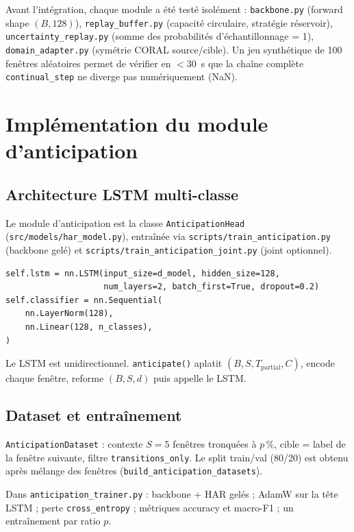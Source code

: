 \documentclass[a4paper,12pt]{report}
\begin{document}
Avant l'intégration, chaque module a été testé isolément : \texttt{backbone.py}
(forward shape $(B,128)$), \texttt{replay\_buffer.py} (capacité circulaire,
stratégie réservoir), \texttt{uncertainty\_replay.py} (somme des probabilités
d'échantillonnage = 1), \texttt{domain\_adapter.py} (symétrie CORAL source/cible).
Un jeu synthétique de 100 fenêtres aléatoires permet de vérifier en $<$30~s que
la chaîne complète \texttt{continual\_step} ne diverge pas numériquement (NaN).

\section{Implémentation du module d'anticipation}

\subsection{Architecture LSTM multi-classe}

Le module d'anticipation est la classe \texttt{AnticipationHead}
(\texttt{src/models/har\_model.py}), entraînée via
\texttt{scripts/train\_anticipation.py} (backbone gelé) et
\texttt{scripts/train\_anticipation\_joint.py} (joint optionnel).

\begin{verbatim}
self.lstm = nn.LSTM(input_size=d_model, hidden_size=128,
                    num_layers=2, batch_first=True, dropout=0.2)
self.classifier = nn.Sequential(
    nn.LayerNorm(128),
    nn.Linear(128, n_classes),
)
\end{verbatim}

Le LSTM est unidirectionnel. \texttt{anticipate()} aplatit
$(B,S,T_{\mathrm{partial}},C)$, encode chaque fenêtre, reforme $(B,S,d)$
puis appelle le LSTM.

\subsection{Dataset et entraînement}

\texttt{AnticipationDataset} : contexte $S=5$ fenêtres tronquées à $p\,\%$,
cible = label de la fenêtre suivante, filtre \texttt{transitions\_only}.
Le split train/val (80/20) est obtenu après mélange des fenêtres
(\texttt{build\_anticipation\_datasets}).

Dans \texttt{anticipation\_trainer.py} : backbone + HAR gelés ; AdamW sur la
tête LSTM ; perte \texttt{cross\_entropy} ; métriques accuracy et macro-F1 ;
un entraînement par ratio $p$.
\end{document}
